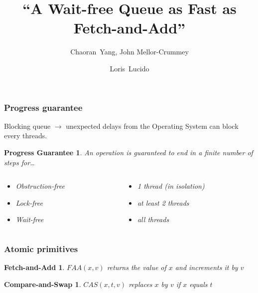 \documentclass[10pt,a4paper]{beamer}
\title{``A Wait-free Queue as Fast as Fetch-and-Add'' }
\subtitle{Chaoran~Yang, John Mellor-Crummey}
\author[L. Lucido]{Loris~Lucido\\[-.25em]}
\institute[IR]{Lecture d'articles - Soutenance}
\date{\displaydate{date}}
\begin{document}
\begin{frame}
  \vspace{3.5em}
  \titlepage
\end{frame}


\begin{frame}
  \frametitle{Progress guarantee}
  Blocking queue $\rightarrow$ unexpected delays from the Operating System
  can block every threads. \center \vfill
  \newtheorem{progress}[theorem]{Progress Guarantee}
  \begin{progress}
    \center
    An operation is guaranteed to end in a finite number of steps for\ldots
    \begin{columns}
      \begin{column}{0.5\textwidth}
        \begin{itemize}
        \item Obstruction-free
        \item Lock-free
        \item Wait-free
        \end{itemize}
      \end{column}
      \begin{column}{0.5\textwidth}
        \begin{itemize}
        \item[] 1 thread (in isolation)
        \item[] at least 2 threads
        \item[] all threads
        \end{itemize}
      \end{column}
    \end{columns}
  \end{progress}
\end{frame}

\begin{frame}
  \frametitle{Atomic primitives}
  \newtheorem{faa}[theorem]{Fetch-and-Add}
  \newtheorem{cas}[theorem]{Compare-and-Swap}
  \begin{faa}
    $FAA(x, v)$ returns the value of $x$ and increments it by $v$
  \end{faa}
  \vfill
  \begin{cas}
    $CAS(x,t,v)$ replaces $x$ by $v$ if $x$ equals $t$
  \end{cas}
\end{frame}
\end{document}
